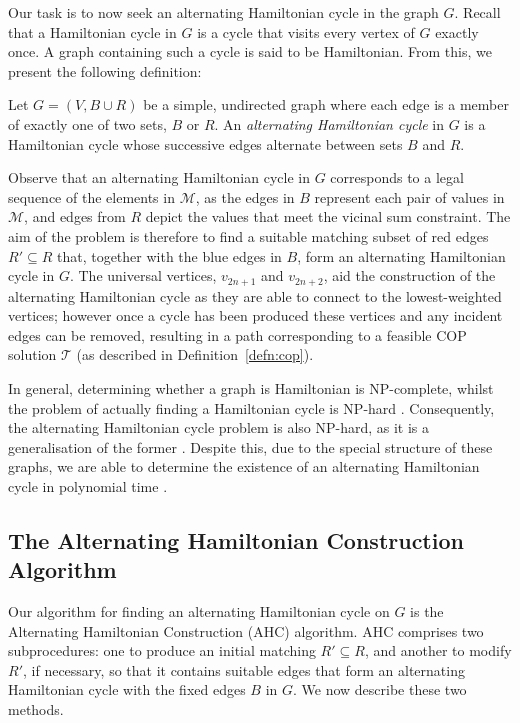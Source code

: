 \documentclass[a4paper,11pt,authoryear]{elsarticle}
\begin{document}
Our task is to now seek an alternating Hamiltonian cycle in the graph $G$. Recall that a Hamiltonian cycle in $G$ is a cycle that visits every vertex of $G$ exactly once. A graph containing such a cycle is said to be Hamiltonian. From this, we present the following definition:

\begin{definition} %
	Let $G = (V, B \cup R)$ be a simple, undirected graph where each edge is a member of exactly one of two sets, $B$ or $R$. An \emph{alternating Hamiltonian cycle} in $G$ is a Hamiltonian cycle whose successive edges alternate between sets $B$ and $R$.
	\label{defn:althamcycle}
\end{definition}

\noindent Observe that an alternating Hamiltonian cycle in $G$ corresponds to a legal sequence of the elements in $\mathcal{M}$, as the edges in $B$ represent each pair of values in $\mathcal{M}$, and edges from $R$ depict the values that meet the vicinal sum constraint. The aim of the problem is therefore to find a suitable matching subset of red edges $R' \subseteq R$ that, together with the blue edges in $B$, form an alternating Hamiltonian cycle in $G$. The universal vertices, $v_{2n+1}$ and $v_{2n+2}$, aid the construction of the alternating Hamiltonian cycle as they are able to connect to the lowest-weighted vertices; however once a cycle has been produced these vertices and any incident edges can be removed, resulting in a path corresponding to a feasible COP solution $\mathcal{T}$ (as described in Definition~\ref{defn:cop}).

In general, determining whether a graph is Hamiltonian is NP-complete, whilst the problem of actually finding a Hamiltonian cycle is NP-hard \cite{karp1972}. Consequently, the alternating Hamiltonian cycle problem is also NP-hard, as it is a generalisation of the former \cite{haggkvist1977}. Despite this, due to the special structure of these graphs, we are able to determine the existence of an alternating Hamiltonian cycle in polynomial time \cite{hawa2018}. 

\subsection{The Alternating Hamiltonian Construction Algorithm}
\label{sub:ahc}
\noindent Our algorithm for finding an alternating Hamiltonian cycle on $G$ is the Alternating Hamiltonian Construction (AHC) algorithm. AHC comprises two subprocedures: one to produce an initial matching $R' \subseteq R$, and another to modify $R'$, if necessary, so that it contains suitable edges that form an alternating Hamiltonian cycle with the fixed edges $B$ in $G$. We now describe these two methods.
\end{document}
